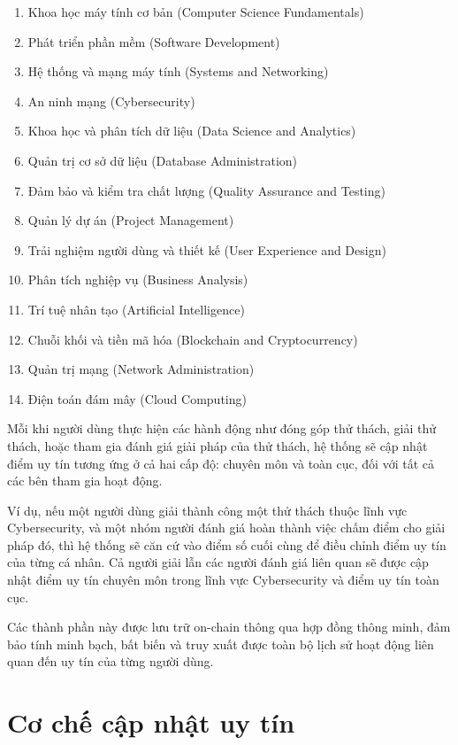 \begin{enumerate}
  \item Khoa học máy tính cơ bản (Computer Science Fundamentals)
  \item Phát triển phần mềm (Software Development)
  \item Hệ thống và mạng máy tính (Systems and Networking)
  \item An ninh mạng (Cybersecurity)
  \item Khoa học và phân tích dữ liệu (Data Science and Analytics)
  \item Quản trị cơ sở dữ liệu (Database Administration)
  \item Đảm bảo và kiểm tra chất lượng (Quality Assurance and Testing)
  \item Quản lý dự án (Project Management)
  \item Trải nghiệm người dùng và thiết kế (User Experience and Design)
  \item Phân tích nghiệp vụ (Business Analysis)
  \item Trí tuệ nhân tạo (Artificial Intelligence)
  \item Chuỗi khối và tiền mã hóa (Blockchain and Cryptocurrency)
  \item Quản trị mạng (Network Administration)
  \item Điện toán đám mây (Cloud Computing)
\end{enumerate}

Mỗi khi người dùng thực hiện các hành động như đóng góp thử thách, giải thử thách, hoặc tham gia đánh giá giải pháp của thử thách, hệ thống sẽ cập nhật điểm uy tín tương ứng ở cả hai cấp độ: chuyên môn và toàn cục, đối với tất cả các bên tham gia hoạt động.

Ví dụ, nếu một người dùng giải thành công một thử thách thuộc lĩnh vực Cybersecurity, và một nhóm người đánh giá hoàn thành việc chấm điểm cho giải pháp đó, thì hệ thống sẽ căn cứ vào điểm số cuối cùng để điều chỉnh điểm uy tín của từng cá nhân.
Cả người giải lẫn các người đánh giá liên quan sẽ được cập nhật điểm uy tín chuyên môn trong lĩnh vực Cybersecurity và điểm uy tín toàn cục.

Các thành phần này được lưu trữ on-chain thông qua hợp đồng thông minh, đảm bảo tính minh bạch, bất biến và truy xuất được toàn bộ lịch sử hoạt động liên quan đến uy tín của từng người dùng.

\section{Cơ chế cập nhật uy tín}

